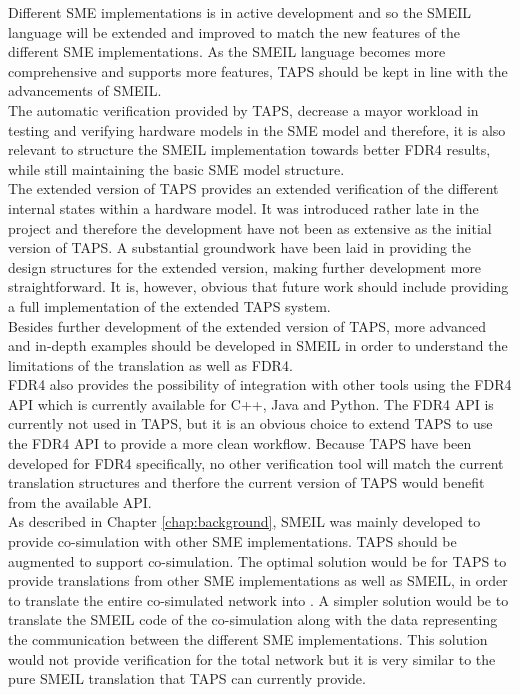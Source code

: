 
Different SME implementations is in active development and so the SMEIL language will be extended and improved to match the new features of the different SME implementations. As the SMEIL language becomes more comprehensive and supports more features, TAPS should be kept in line with the advancements of SMEIL.\\
The automatic verification provided by TAPS, decrease a mayor workload in testing and verifying hardware models in the SME model and therefore, it is also relevant to structure the SMEIL implementation towards better FDR4 results, while still maintaining the basic SME model structure. \\

The extended version of TAPS provides an extended verification of the different internal states within a hardware model. It was introduced rather late in the project and therefore the development have not been as extensive as the initial version of TAPS. A substantial groundwork have been laid in providing the design structures for the extended version, making further development more straightforward. It is, however, obvious that future work should include providing a full implementation of the extended TAPS system. \\

Besides further development of the extended version of TAPS, more advanced and in-depth examples should be developed in SMEIL in order to understand the limitations of the translation as well as FDR4.\\

FDR4 also provides the possibility of integration with other tools using the FDR4 API which is currently available for C++, Java and Python. The FDR4 API is currently not used in TAPS, but it is an obvious choice to extend TAPS to use the FDR4 API to provide a more clean workflow. Because TAPS have been developed for FDR4 specifically, no other verification tool will match the current translation structures and therfore the current version of TAPS would benefit from the available API.\\

As described in Chapter \ref{chap:background}, SMEIL was mainly developed to provide co-simulation with other SME implementations. TAPS should be augmented to support co-simulation. The optimal solution would be for TAPS to provide translations from other SME implementations as well as SMEIL, in order to translate the entire co-simulated network into \cspm{}. A simpler solution would be to translate the SMEIL code of the co-simulation along with the data representing the communication between the different SME implementations. This solution would not provide verification for the total network but it is very similar to the pure SMEIL translation that TAPS can currently provide.\\


